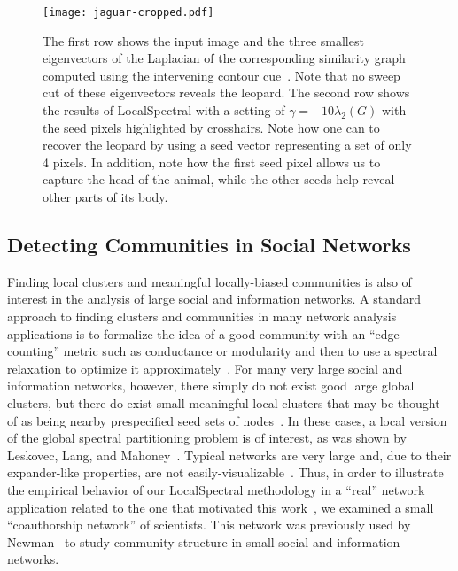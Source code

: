 \documentclass[11pt]{article}
\begin{document}
\begin{figure}[h]
\begin{center}
\texttt{[image: jaguar-cropped.pdf]}
   \end{center}
\caption{The first row shows the input image and the three smallest eigenvectors of the Laplacian of the corresponding similarity graph computed using the intervening contour cue~\cite{MAFM08}.  Note that no sweep cut of these eigenvectors reveals the leopard.  The second row shows the results of \textsf{LocalSpectral} with a setting of $\gamma = -10 \lambda_2(G)$ with the seed pixels highlighted by crosshairs.  Note how one can to recover the leopard by using a seed vector representing a set of only 4 pixels.  In addition, note how the first seed pixel allows us to capture the head of the animal, while the other seeds help reveal other parts of its body. }
\label{fig:imseg}	
\end{figure}


\subsection{Detecting Communities in Social Networks}

Finding local clusters and meaningful locally-biased communities is also of 
interest in the analysis of large social and information networks.  
A standard approach to finding clusters and communities in many network 
analysis applications is to formalize the idea of a good community with an 
``edge counting'' metric such as conductance or modularity and then to use a 
spectral relaxation to optimize it
approximately~\cite{newman2006finding,newman2006_ModularityPNAS}.
For many very large social and information networks, however, there simply do
not exist good large global clusters, but there do exist small
meaningful local clusters that may be thought of as being nearby 
prespecified seed sets of
nodes~\cite{LLDM08_communities_CONF,LLDM09_communities_IM,LLM10_communities_CONF}.
In these cases, a local version of the global spectral partitioning
problem is of interest, as was shown by Leskovec, Lang, and
Mahoney~\cite{LLM10_communities_CONF}.
Typical networks are very large and, due to their expander-like properties, 
are not 
easily-visualizable~\cite{LLDM08_communities_CONF,LLDM09_communities_IM}.
Thus, in order to illustrate the empirical behavior of our
\textsf{LocalSpectral} methodology in a ``real'' network application related 
to the one that motivated this 
work~\cite{LLDM08_communities_CONF,LLDM09_communities_IM,LLM10_communities_CONF}, 
we examined a small ``coauthorship network'' of scientists.
This network was previously used by Newman~\cite{newman2006finding} to study 
community structure in small social and information networks.
\end{document}
